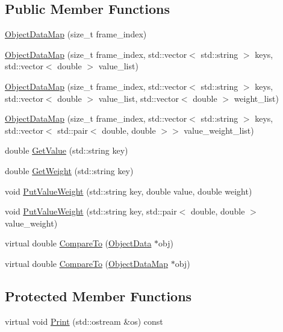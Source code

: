 \subsection*{Public Member Functions}
\begin{DoxyCompactItemize}
\item 
\hyperlink{classcore_1_1ObjectDataMap_ac6df34682a715db6845667f7dda1c795}{Object\+Data\+Map} (size\+\_\+t frame\+\_\+index)
\item 
\hyperlink{classcore_1_1ObjectDataMap_a573add8d73646e6c5f183a9a0c159596}{Object\+Data\+Map} (size\+\_\+t frame\+\_\+index, std\+::vector$<$ std\+::string $>$ keys, std\+::vector$<$ double $>$ value\+\_\+list)
\item 
\hyperlink{classcore_1_1ObjectDataMap_a5727c237d73f3f16c94a748c1b9b0c74}{Object\+Data\+Map} (size\+\_\+t frame\+\_\+index, std\+::vector$<$ std\+::string $>$ keys, std\+::vector$<$ double $>$ value\+\_\+list, std\+::vector$<$ double $>$ weight\+\_\+list)
\item 
\hyperlink{classcore_1_1ObjectDataMap_ad2af0de7438ed72be68348ac992568b6}{Object\+Data\+Map} (size\+\_\+t frame\+\_\+index, std\+::vector$<$ std\+::string $>$ keys, std\+::vector$<$ std\+::pair$<$ double, double $>$$>$ value\+\_\+weight\+\_\+list)
\item 
double \hyperlink{classcore_1_1ObjectDataMap_a276c89da6f3318d2baa2e9678e9508f7}{Get\+Value} (std\+::string key)
\item 
double \hyperlink{classcore_1_1ObjectDataMap_a4cd92ab91559063b4e6ab12fec53cc05}{Get\+Weight} (std\+::string key)
\item 
void \hyperlink{classcore_1_1ObjectDataMap_a61eb1326be41c3411dc0c1757f360591}{Put\+Value\+Weight} (std\+::string key, double value, double weight)
\item 
void \hyperlink{classcore_1_1ObjectDataMap_a8c2ef0cebadf12e4aa67056823020cc3}{Put\+Value\+Weight} (std\+::string key, std\+::pair$<$ double, double $>$ value\+\_\+weight)
\item 
virtual double \hyperlink{classcore_1_1ObjectDataMap_ad00d1998652e4d2ffa2629128c9c2947}{Compare\+To} (\hyperlink{classcore_1_1ObjectData}{Object\+Data} $\ast$obj)
\item 
virtual double \hyperlink{classcore_1_1ObjectDataMap_a38ec46bab19a5770cecb00533e8d37c3}{Compare\+To} (\hyperlink{classcore_1_1ObjectDataMap}{Object\+Data\+Map} $\ast$obj)
\end{DoxyCompactItemize}
\subsection*{Protected Member Functions}
\begin{DoxyCompactItemize}
\item 
virtual void \hyperlink{classcore_1_1ObjectDataMap_a16fbcc2b99feb1545e1a66f828680b1a}{Print} (std\+::ostream \&os) const
\end{DoxyCompactItemize}

